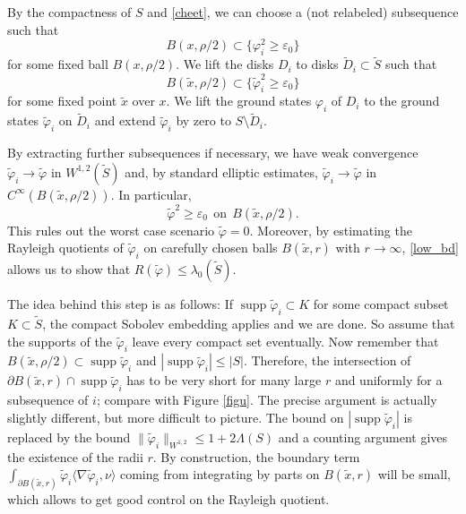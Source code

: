 \documentclass[a4paper,11pt]{amsart}
\numberwithin{equation}{section}
\theoremstyle{definition}
\def\ve{\varepsilon}
\def\vf{\varphi}
\DeclareMathOperator{\supp}{supp}
\begin{document}
By the compactness of $S$ and \cref{cheet}, we can choose a (not relabeled) subsequence such that 
\begin{equation*}
B(x,\rho/2) \subset \{\varphi_i^2 \geq \ve_0\}
\end{equation*}
for some fixed ball $B(x,\rho/2).$
We lift the disks $D_i$ to disks $\tilde D_i\subset\tilde S$ such that 
\begin{equation*}
B(\tilde x,\rho/2) \subset \{\tilde \varphi_i^2 \geq \ve_0\}
\end{equation*}
for some fixed point $\tilde x$ over $x$.
We lift the ground states $\vf_i$ of $D_i$ to the ground states $\tilde \vf_i$ on $\tilde D_i$
and extend $\tilde\vf_i$ by zero to $S\setminus\tilde D_i$.

By extracting further subsequences if necessary, we have weak convergence $\tilde \varphi_i \to \tilde \varphi$ in $W^{1,2}(\tilde S)$
and, by standard elliptic estimates, $\tilde \varphi_i \to \tilde \varphi$ in $C^\infty(B(\tilde x, \rho/2)).$
In particular, 
\begin{equation} \label{low_bd}
\tilde\varphi^2 \geq \ve_0 \ \ \text{on}\ \ B(\tilde x, \rho/2).
\end{equation}
This rules out the worst case scenario $\tilde \varphi = 0.$
Moreover, by estimating the Rayleigh quotients of $\tilde \varphi_i$ on carefully chosen balls $B(\tilde x, r)$ with $r \to \infty$,
\eqref{low_bd} allows us to show that $R(\tilde \varphi)\leq \lambda_0(\tilde S).$

The idea behind this step is as follows: If $\supp \tilde \varphi_i \subset K$ for
some compact subset $K \subset \tilde S$,
the compact Sobolev embedding applies and we are done.
So assume that the supports of the $\tilde \varphi_i$ leave every compact set eventually.
Now remember that $B(\tilde x,\rho/2) \subset \supp \tilde \varphi_i$ and $|\supp \tilde \varphi_i| \leq |S|$.
Therefore, the intersection of $\partial B(\tilde x,r) \cap \supp \tilde \varphi_i$
has to be very short for many large $r$ and uniformly for a subsequence of $i$; compare with Figure \ref{figu}.
The precise argument is actually slightly different, but more difficult to picture.
The bound on $|\supp \tilde \varphi_i|$ is replaced by the bound $\|\tilde\varphi_i\|_{W^{1,2}}\leq 1+2\Lambda(S)$ and a counting argument gives the existence of the radii $r$.
By construction, the boundary term 
$\int_{\partial B(\tilde x,r)}  \tilde \varphi_i \langle \nabla \tilde \varphi_i, \nu \rangle$
coming from integrating by parts on $B(\tilde x, r)$ will be small, which allows to get good control on the Rayleigh quotient.
\end{document}
